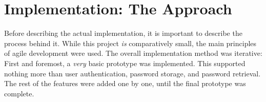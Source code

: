\chapter{Implementation: The Approach}
	Before describing the actual implementation, it is important to describe the process behind it. While this project \emph{is} comparatively small, the main principles of agile development were used. The overall implementation method was iterative: First and foremost, a \emph{very} basic prototype was implemented. This supported nothing more than user authentication, password storage, and password retrieval. The rest of the features were added one by one, until the final prototype was complete.